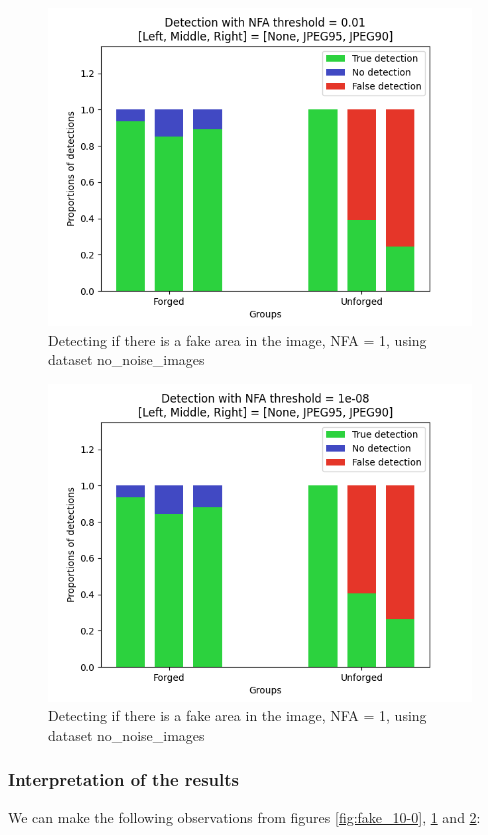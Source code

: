 \documentclass[sigconf, nonacm]{acmart}
\begin{document}
\begin{figure}[p]
    \centering
    \includegraphics[width=0.93\columnwidth]{figures/forgery_detection_nfa_0.01.png}
    \caption{Detecting if there is a fake area in the image, NFA = 1, using dataset no\_noise\_images \cite{colom_noise_2023}}
    \label{fig:fake_10-2}
\end{figure}

\begin{figure}[p]
    \centering
    \includegraphics[width=0.93\columnwidth]{figures/forgery_detection_nfa_1e-08.png}
    \caption{Detecting if there is a fake area in the image, NFA = 1, using dataset no\_noise\_images \cite{colom_noise_2023}}
    \label{fig:fake_10-8}
\end{figure}

\subsubsection{Interpretation of the results} We can make the following observations from  figures \ref{fig:fake_10-0}, \ref{fig:fake_10-2} and \ref{fig:fake_10-8}:
\end{document}
